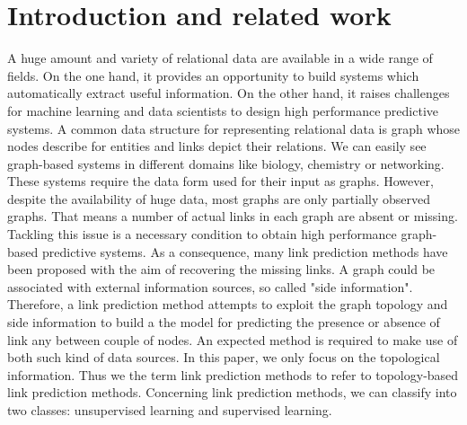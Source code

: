 \documentclass[runningheads,a4paper]{llncs}
\begin{document}
\section{Introduction and related work}
A huge amount and variety of relational data are available in a wide range of fields. On the one hand, it provides an opportunity to build systems which automatically extract useful information. On the other hand, it raises challenges for machine learning and data scientists to design high performance predictive systems. A common data structure for representing relational data is graph whose nodes describe for entities and links depict their relations. We can easily see graph-based systems in different domains like biology, chemistry or networking. These systems require the data form used for their input as graphs. However, despite the availability of huge data, most graphs are only partially observed graphs. That means a number of actual links in each graph are absent or missing. Tackling this issue is a necessary condition to obtain high performance graph-based predictive systems. As a consequence, many link prediction methods have been proposed with the aim of recovering the missing links. A graph could be associated with external information sources, so called "side information". Therefore, a link prediction method attempts to exploit the graph topology and side information to build a the model for predicting the presence or absence of link any between couple of nodes. An expected method is required to make use of both such kind of data sources. In this paper, we only focus on the topological information. Thus we the term link prediction methods to refer to topology-based link prediction methods. Concerning link prediction methods, we can classify into two classes: unsupervised learning and supervised learning. 
\end{document}
